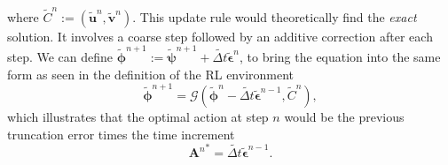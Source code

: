 where $\tilde C^n:=(\tilde{\boldsymbol u}^n, \tilde{\boldsymbol v}^n)$. This update rule would theoretically find the \textit{exact} solution. It involves a coarse step followed by an additive correction after each step. We can define $ \tilde{\boldsymbol\phi}^{n+1} :=\tilde{\boldsymbol\psi}^{n+1} + \widetilde{\Delta t} \tilde{\boldsymbol\epsilon}^n$, to bring the equation into the same form as seen in the definition of the RL environment
$$ 
\tilde{\boldsymbol\phi}^{n+1} = \mathcal G(\tilde{\boldsymbol\phi}^{n} - \widetilde{\Delta t} \tilde{\boldsymbol\epsilon}^{n-1}, \tilde C^n),
$$
which illustrates that the optimal action at step $n$ would be the previous truncation error times the time increment
\begin{equation}
    \boxed{
    {\boldsymbol A^n}^* = \widetilde{\Delta t} \tilde{\boldsymbol\epsilon}^{n-1}.
    }
\end{equation}
